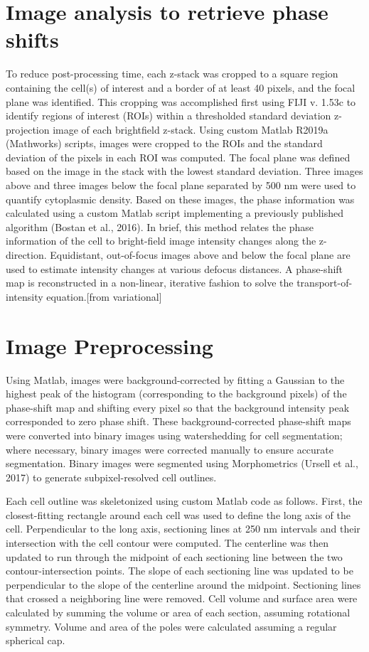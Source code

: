 \section{Image analysis to retrieve phase shifts}
To reduce post-processing time, each z-stack was cropped to a square region containing the cell(s) of interest and a border of at least 40 pixels, and the focal plane was identified. This cropping was accomplished first using FIJI v. 1.53c to identify regions of interest (ROIs) within a thresholded standard deviation z-projection image of each brightfield z-stack. Using custom Matlab R2019a (Mathworks) scripts, images were cropped to the ROIs and the standard deviation of the pixels in each ROI was computed. The focal plane was defined based on the image in the stack with the lowest standard deviation. Three images above and three images below the focal plane separated by 500 nm were used to quantify cytoplasmic density. Based on these images, the phase information was calculated using a custom Matlab script implementing a previously published algorithm (Bostan et al., 2016). In brief, this method relates the phase information of the cell to bright-field image intensity changes along the z-direction. Equidistant, out-of-focus images above and below the focal plane are used to estimate intensity changes at various defocus distances. A phase-shift map is reconstructed in a non-linear, iterative fashion to solve the transport-of-intensity equation.[from variational]

\section{Image Preprocessing}
Using Matlab, images were background-corrected by fitting a Gaussian to the highest peak of the histogram (corresponding to the background pixels) of the phase-shift map and shifting every pixel so that the background intensity peak corresponded to zero phase shift. These background-corrected phase-shift maps were converted into binary images using watershedding for cell segmentation; where necessary, binary images were corrected manually to ensure accurate segmentation. Binary images were segmented using Morphometrics (Ursell et al., 2017) to generate subpixel-resolved cell outlines.

Each cell outline was skeletonized using custom Matlab code as follows. First, the closest-fitting rectangle around each cell was used to define the long axis of the cell. Perpendicular to the long axis, sectioning lines at 250 nm intervals and their intersection with the cell contour were computed. The centerline was then updated to run through the midpoint of each sectioning line between the two contour-intersection points. The slope of each sectioning line was updated to be perpendicular to the slope of the centerline around the midpoint. Sectioning lines that crossed a neighboring line were removed. Cell volume and surface area were calculated by summing the volume or area of each section, assuming rotational symmetry. Volume and area of the poles were calculated assuming a regular spherical cap.

